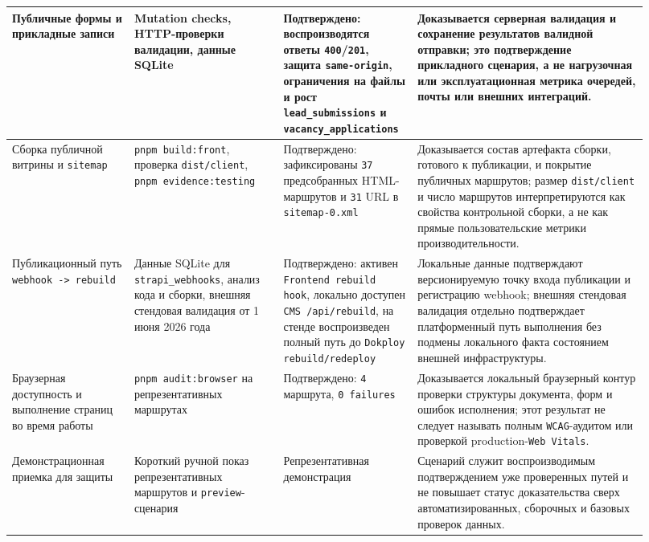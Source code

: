 \begin{longtable}{@{}L{0.18\linewidth}L{0.22\linewidth}L{0.18\linewidth}L{0.34\linewidth}@{}}
  \midrule
  Публичные формы и прикладные записи & Mutation checks, HTTP-проверки валидации, данные SQLite & Подтверждено: воспроизводятся ответы \texttt{400}/\texttt{201}, защита \texttt{same-origin}, ограничения на файлы и рост \texttt{lead\_submissions} и \texttt{vacancy\_applications} & Доказывается серверная валидация и сохранение результатов валидной отправки; это подтверждение прикладного сценария, а не нагрузочная или эксплуатационная метрика очередей, почты или внешних интеграций. \\
  \midrule
  Сборка публичной витрины и \texttt{sitemap} & \texttt{pnpm build:front}, проверка \texttt{dist/client}, \texttt{pnpm evidence:testing} & Подтверждено: зафиксированы \texttt{37} предсобранных HTML-маршрутов и \texttt{31} URL в \texttt{sitemap-0.xml} & Доказывается состав артефакта сборки, готового к публикации, и покрытие публичных маршрутов; размер \texttt{dist/client} и число маршрутов интерпретируются как свойства контрольной сборки, а не как прямые пользовательские метрики производительности. \\
  \midrule
  Публикационный путь \texttt{webhook -> rebuild} & Данные SQLite для \texttt{strapi\_webhooks}, анализ кода и сборки, внешняя стендовая валидация от 1 июня 2026 года & Подтверждено: активен \texttt{Frontend rebuild hook}, локально доступен \texttt{CMS /api/rebuild}, на стенде воспроизведен полный путь до \texttt{Dokploy rebuild/redeploy} & Локальные данные подтверждают версионируемую точку входа публикации и регистрацию webhook; внешняя стендовая валидация отдельно подтверждает платформенный путь выполнения без подмены локального факта состоянием внешней инфраструктуры. \\
  \midrule
  Браузерная доступность и выполнение страниц во время работы & \texttt{pnpm audit:browser} на репрезентативных маршрутах & Подтверждено: \texttt{4} маршрута, \texttt{0 failures} & Доказывается локальный браузерный контур проверки структуры документа, форм и ошибок исполнения; этот результат не следует называть полным \texttt{WCAG}-аудитом или проверкой production-\texttt{Web Vitals}. \\
  \midrule
  Демонстрационная приемка для защиты & Короткий ручной показ репрезентативных маршрутов и \texttt{preview}-сценария & Репрезентативная демонстрация & Сценарий служит воспроизводимым подтверждением уже проверенных путей и не повышает статус доказательства сверх автоматизированных, сборочных и базовых проверок данных. \\
\end{longtable}
\endgroup

